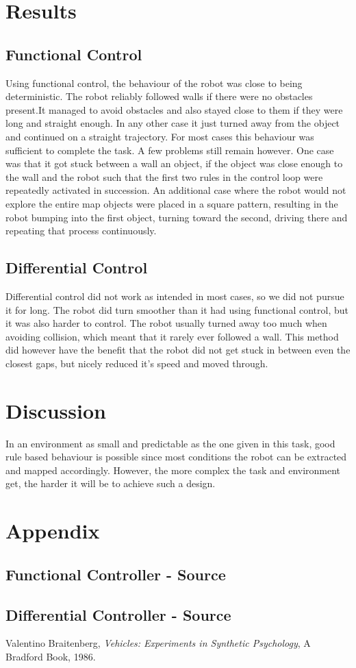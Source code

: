 \documentclass[paper=a4, fontsize=12pt]{scrartcl}	%
\numberwithin{equation}{section}		%
\numberwithin{figure}{section}			%
\numberwithin{table}{section}				%
\begin{document}
\section{Results}
\subsection{Functional Control}
Using functional control, the behaviour of the robot was close to being deterministic. The robot reliably followed walls if there were no obstacles present.It managed to avoid obstacles and also stayed close to them if they were long and straight enough. In any other case it just turned away from the object and continued on a straight trajectory. For most cases this behaviour was sufficient to complete the task. A few problems still remain however. One case was that it got stuck between a wall an object, if the object was close enough to the wall and the robot such that the first two rules in the control loop were repeatedly activated in succession. An additional case where the robot would not explore the entire map objects were placed in a square pattern, resulting in the robot bumping into the first object, turning toward the second, driving there and repeating that process continuously.
\subsection{Differential Control}
Differential control did not work as intended in most cases, so we did not pursue it for long. The robot did turn smoother than it had using functional control, but it was also harder to control. The robot usually turned away too much when avoiding collision, which meant that it rarely ever followed a wall. This method did however have the benefit that the robot did not get stuck in between even the closest gaps, but nicely reduced it's speed and moved through.
\section{Discussion}
In an environment as small and predictable as the one given in this task, good rule based behaviour is possible since most conditions the robot can be extracted and mapped accordingly. However, the more complex the task and environment get, the harder it will be to achieve such a design. 
\section{Appendix}
\subsection{Functional Controller - Source}

\subsection{Differential Controller - Source}

\begin{thebibliography}{9}
  Valentino Braitenberg,
  \emph{Vehicles: Experiments in Synthetic Psychology},
  A Bradford Book,
  1986.
\end{thebibliography}

\end{document}
